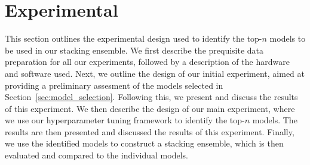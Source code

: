 \section{Experimental}\label{sec:methodology}
This section outlines the experimental design used to identify the top-$n$ models to be used in our stacking ensemble.
We first describe the prequisite data preparation for all our experiments, followed by a description of the hardware and software used.
Next, we outline the design of our initial experiment, aimed at providing a preliminary assesment of the models selected in Section~\ref{sec:model_selection}.
Following this, we present and discuss the results of this experiment.
We then describe the design of our main experiment, where we use our hyperparameter tuning framework to identify the top-$n$ models.
The results are then presented and discussed the results of this experiment.
Finally, we use the identified models to construct a stacking ensemble, which is then evaluated and compared to the individual models.




